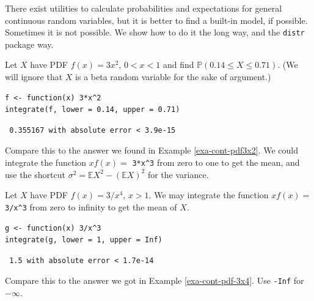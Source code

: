 \documentclass[captions=tableheading]{scrbook}
\begin{document}
There exist utilities to calculate probabilities and expectations for general continuous random variables, but it is better to find a built-in model, if possible. Sometimes it is not possible. We show how to do it the long way, and the \texttt{distr} package way.

\begin{example}
Let \(X\) have PDF \(f(x)=3x^{2}\), \(0<x<1\) and find \(\mathbb{P}(0.14\leq X\leq0.71)\). (We will ignore that \(X\) is a beta random variable for the sake of argument.)


\lstset{language=R}
\begin{lstlisting}
f <- function(x) 3*x^2
integrate(f, lower = 0.14, upper = 0.71)
\end{lstlisting}

\begin{verbatim}
 0.355167 with absolute error < 3.9e-15
\end{verbatim}

Compare this to the answer we found in Example \ref{exa-cont-pdf3x2}. We could integrate the function \(xf(x)=\) \texttt{3*x\textasciicircum{}3} from zero to one to get the mean, and use the shortcut \(\sigma^{2}=\mathbb{E} X^{2}-\left(\mathbb{E} X\right)^{2}\) for the variance. 

\end{example}

\begin{example}
Let \(X\) have PDF \(f(x)=3/x^{4}\), \(x>1\). We may integrate the function \(xf(x)=\) \texttt{3/x\textasciicircum{}3} from zero to infinity to get the mean of \(X\).


\lstset{language=R}
\begin{lstlisting}
g <- function(x) 3/x^3
integrate(g, lower = 1, upper = Inf)
\end{lstlisting}

\begin{verbatim}
 1.5 with absolute error < 1.7e-14
\end{verbatim}

Compare this to the answer we got in Example \ref{exa-cont-pdf-3x4}. Use \texttt{-Inf} for \(-\infty\).

\end{example}
\end{document}

